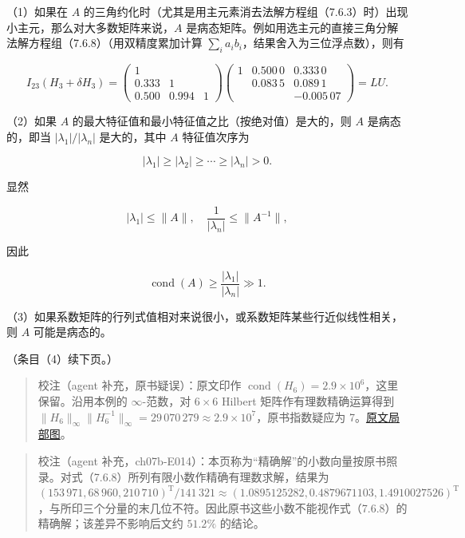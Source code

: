 \documentclass[
  10pt,
  fontset=fandol]{ctexart}
\begin{document}
（1）如果在 \(A\) 的三角约化时（尤其是用主元素消去法解方程组（7.6.3）时）出现小主元，那么对大多数矩阵来说，\(A\) 是病态矩阵。例如用选主元的直接三角分解法解方程组（7.6.8）（用双精度累加计算 \(\sum_i a_ib_i\)，结果舍入为三位浮点数），则有

\[
I_{23}(H_3+\delta H_3)
=\begin{pmatrix}
1&&\\
0.333&1&\\
0.500&0.994&1
\end{pmatrix}
\begin{pmatrix}
1&0.500\,0&0.333\,0\\
&0.083\,5&0.089\,1\\
&&\boxed{-0.005\,07}
\end{pmatrix}
=LU.
\]

（2）如果 \(A\) 的最大特征值和最小特征值之比（按绝对值）是大的，则 \(A\) 是病态的，即当 \(|\lambda_1|/|\lambda_n|\) 是大的，其中 \(A\) 特征值次序为

\[
|\lambda_1|\geqslant|\lambda_2|\geqslant\cdots\geqslant|\lambda_n|>0.
\]

显然

\[
|\lambda_1|\leqslant\|A\|,\quad\frac1{|\lambda_n|}\leqslant\|A^{-1}\|,
\]

因此

\[
\operatorname{cond}(A)\geqslant\frac{|\lambda_1|}{|\lambda_n|}\gg1.
\]

（3）如果系数矩阵的行列式值相对来说很小，或系数矩阵某些行近似线性相关，则 \(A\) 可能是病态的。

（条目（4）续下页。）

\begin{quote}
校注（agent 补充，原书疑误）：原文印作 \(\operatorname{cond}(H_6)=2.9\times10^6\)，这里保留。沿用本例的 \(\infty\)-范数，对 \(6\times6\) Hilbert 矩阵作有理数精确运算得到 \(\|H_6\|_\infty\|H_6^{-1}\|_\infty=29\,070\,279\approx2.9\times10^7\)，原书指数疑应为 7。\href{../assets/ch07b/208-h6-cond.png}{原文局部图}。
\end{quote}

\begin{quote}
校注（agent 补充，ch07b-E014）：本页称为``精确解''的小数向量按原书照录。对式（7.6.8）所列有限小数作精确有理数求解，结果为 \((153\,971,\allowbreak 68\,960,\allowbreak 210\,710)^{\mathrm T}/141\,321\approx(1.0895125282,\allowbreak 0.4879671103,\allowbreak 1.4910027526)^{\mathrm T}\)，与所印三个分量的末几位不符。因此原书这些小数不能视作式（7.6.8）的精确解；该差异不影响后文约 \(51.2\%\) 的结论。
\end{quote}
\end{document}
